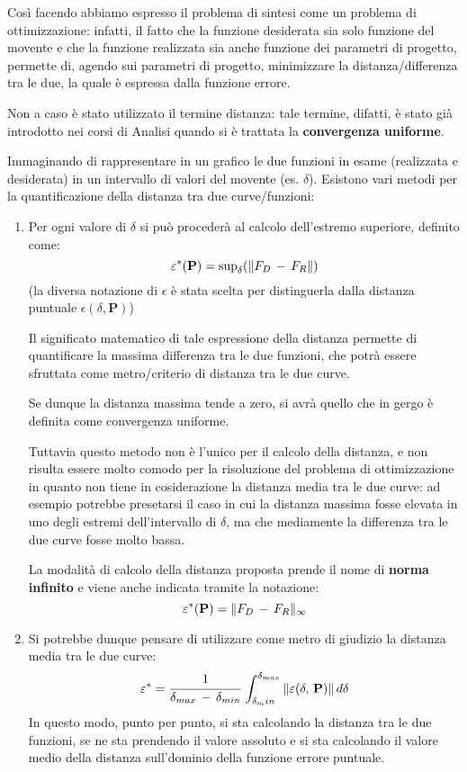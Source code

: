 Così facendo abbiamo espresso il problema di sintesi come un problema di ottimizzazione: infatti, il fatto che la funzione desiderata sia solo funzione del movente e che la funzione realizzata sia anche funzione dei parametri di progetto, permette di, agendo sui parametri di progetto, minimizzare la distanza/differenza tra le due, la quale è espressa dalla funzione errore.

Non a caso è stato utilizzato il termine distanza: tale termine, difatti, è stato già introdotto nei corsi di Analisi quando si è trattata la \textbf{convergenza uniforme}.

Immaginando di rappresentare in un grafico le due funzioni in esame (realizzata e desiderata) in un intervallo di valori del movente (es. $\delta$).
Esistono vari metodi per la quantificazione della distanza tra due curve/funzioni:
\begin{enumerate}[$\rightarrow$]
\item Per ogni valore di $\delta$ si può procederà al calcolo dell'estremo superiore, definito come:
\[\varepsilon^*(\mathbf{P}) = \text{sup}_{\delta}(\lVert F_D\,-\,F_R\rVert)\]
(la diversa notazione di $\epsilon$ è stata scelta per distinguerla dalla distanza puntuale $\epsilon(\delta, \mathbf{P})$)

Il significato matematico di tale espressione della distanza permette di quantificare la massima differenza tra le due funzioni, che potrà essere sfruttata come metro/criterio di distanza tra le due curve.

Se dunque la distanza massima tende a zero, si avrà quello che in gergo è definita come convergenza uniforme.

Tuttavia questo metodo non è l'unico per il calcolo della distanza, e non risulta essere molto comodo per la risoluzione del problema di ottimizzazione in quanto non tiene in cosiderazione la distanza media tra le due curve: ad esempio potrebbe presetarsi il caso in cui la distanza massima fosse elevata in uno degli estremi dell'intervallo di $\delta$, ma che mediamente la differenza tra le due curve fosse molto bassa.

La modalità di calcolo della distanza proposta prende il nome di \textbf{norma infinito} e viene anche indicata tramite la notazione:
\[\varepsilon^*(\mathbf{P}) = \lVert F_D\,-\,F_R\rVert_{\infty}\]
\item Si potrebbe dunque pensare di utilizzare come metro di giudizio la distanza media tra le due curve:
\[\varepsilon^* = \cfrac{1}{\delta_{max}\,-\,\delta_{min}}\,\int_{\delta_min}^{\delta_{max}}\,\lVert\varepsilon(\delta,\,\mathbf{P})\rVert\,d\delta\]
In questo modo, punto per punto, si sta calcolando la distanza tra le due funzioni, se ne sta prendendo il valore assoluto e si sta calcolando il valore medio della distanza sull'dominio della funzione errore puntuale.


\end{enumerate}
